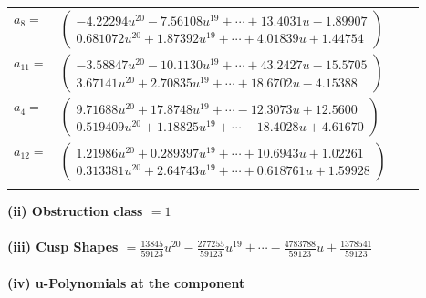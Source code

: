 \documentclass[1p]{elsarticle_modified}
\theoremstyle{definition}
\begin{document}
\begin{tabular}{m{7pt} m{180pt} m{7pt} m{180pt} }
\flushright $a_{8}=$&$\begin{pmatrix}-4.22294 u^{20}-7.56108 u^{19}+\cdots+13.4031 u-1.89907\\0.681072 u^{20}+1.87392 u^{19}+\cdots+4.01839 u+1.44754\end{pmatrix}$ \\
\flushright $a_{11}=$&$\begin{pmatrix}-3.58847 u^{20}-10.1130 u^{19}+\cdots+43.2427 u-15.5705\\3.67141 u^{20}+2.70835 u^{19}+\cdots+18.6702 u-4.15388\end{pmatrix}$ \\
\flushright $a_{4}=$&$\begin{pmatrix}9.71688 u^{20}+17.8748 u^{19}+\cdots-12.3073 u+12.5600\\0.519409 u^{20}+1.18825 u^{19}+\cdots-18.4028 u+4.61670\end{pmatrix}$ \\
\flushright $a_{12}=$&$\begin{pmatrix}1.21986 u^{20}+0.289397 u^{19}+\cdots+10.6943 u+1.02261\\0.313381 u^{20}+2.64743 u^{19}+\cdots+0.618761 u+1.59928\end{pmatrix}$\\&\end{tabular}
\flushleft \textbf{(ii) Obstruction class $= 1$}\\~\\
\flushleft \textbf{(iii) Cusp Shapes $= \frac{13845}{59123} u^{20}-\frac{277255}{59123} u^{19}+\cdots-\frac{4783788}{59123} u+\frac{1378541}{59123}$}\\~\\
\newpage\renewcommand{\arraystretch}{1}
\flushleft \textbf{(iv) u-Polynomials at the component}\newline \\
\end{document}
